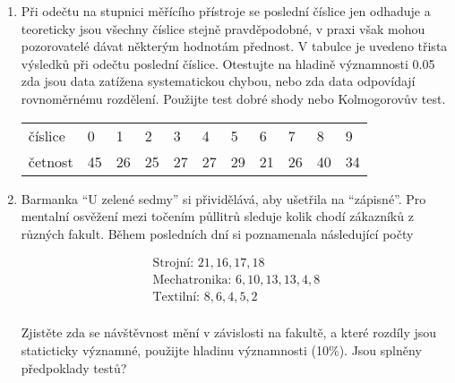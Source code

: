 \documentclass[a4paper,12pt]{article}
\begin{document}
\begin{enumerate}
  
  \item  Při odečtu na stupnici měřícího přístroje se poslední číslice jen odhaduje a 
  teoreticky jsou všechny číslice stejně pravděpodobné, v praxi však mohou pozorovatelé 
  dávat některým hodnotám přednost. V tabulce je uvedeno třista výsledků při odečtu poslední číslice. 
  Otestujte na hladině významnosti 0.05 zda jsou data zatížena systematickou chybou, nebo zda 
  data odpovídají rovnoměrnému rozdělení. Použijte test dobré shody nebo Kolmogorovův test.

\begin{center}
\begin{tabular}{lllllllllll}
číslice &0 &1 &2 &3 &4 &5 &6 &7 &8 &9\\
četnost &45 &26 &25 &27 &27 &29 &21 &26 &40 &34 
\end{tabular}
\end{center}

 
  \item Barmanka ``U zelené sedmy'' si přividělává, aby ušetřila na ``zápisné''. Pro mentalní osvěžení mezi točením půllitrů
  sleduje kolik chodí zákazníků z různých fakult. Během posledních dní si poznamenala následující počty

\begin{align*}
\text{Strojní: } 21, 16, 17, 18 \\
\text{Mechatronika: } 6, 10, 13, 13, 4, 8\\
\text{Textilní: } 8, 6, 4, 5, 2\\
\end{align*}

  Zjistěte zda se návštěvnost mění v závislosti na fakultě, a které rozdíly jsou staticticky významné, použijte hladinu významnosti (10\%).
  Jsou splněny předpoklady testů?
\end{enumerate}
\end{document}
